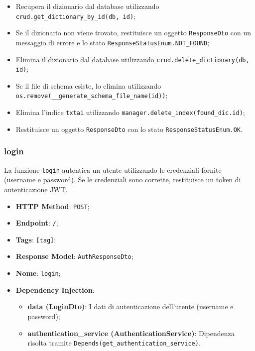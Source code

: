 \begin{itemize}
\item Recupera il dizionario dal database utilizzando \texttt{crud.get\_dictionary\_by\_id(db, id)};
\item Se il dizionario non viene trovato, restituisce un oggetto \texttt{ResponseDto} con un messaggio di errore e lo stato \texttt{ResponseStatusEnum.NOT\_FOUND};
\item Elimina il dizionario dal database utilizzando \texttt{crud.delete\_dictionary(db, id)};
\item Se il file di schema esiste, lo elimina utilizzando \texttt{os.remove(\_\_generate\_schema\-\_\-file\_name(id))};
\item Elimina l'indice \texttt{txtai} utilizzando \texttt{manager.delete\_index(found\_dic.id)};
\item Restituisce un oggetto \texttt{ResponseDto} con lo stato \texttt{ResponseStatusEnum.OK}.
\end{itemize}


\subsubsection{login}

\par La funzione \texttt{login} autentica un utente utilizzando le credenziali fornite (username e password). Se le credenziali sono corrette, restituisce un token di autenticazione JWT.

\begin{itemize}
\item \textbf{HTTP Method}: \texttt{POST};
\item \textbf{Endpoint}: \texttt{/};
\item \textbf{Tags}: \texttt{[tag]};
\item \textbf{Response Model}: \texttt{AuthResponseDto};
\item \textbf{Nome}: \texttt{login};
\item \textbf{Dependency Injection}:
\begin{itemize}
\item \textbf{data (LoginDto)}: I dati di autenticazione dell'utente (username e password);
\item \textbf{authentication\_service (AuthenticationService)}: Dipendenza risolta tramite \texttt{Depends(get\_authentication\_service)}.
\end{itemize}
\end{itemize}

